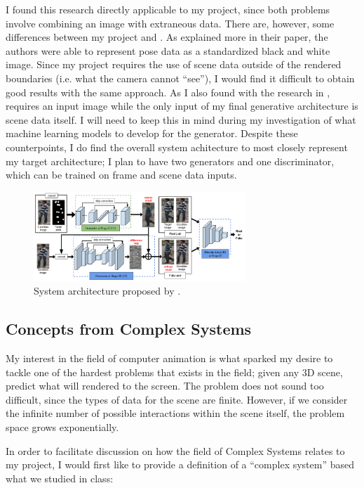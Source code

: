 \documentclass[conference]{IEEEtran}
\begin{document}
I found this research directly applicable
to my project, since both problems involve combining an image with extraneous data. There are, however,
some differences between my project and \cite{ref:pose_guided}. As explained more in their
paper, the authors were able to represent pose data as a standardized black and white image.
Since my project requires the use of scene data outside of the rendered
boundaries (i.e. what the camera cannot ``see''), I would find it difficult to
obtain good results with the same approach. As I also found with the research in
\cite{ref:spatiotemporal}, \cite{ref:pose_guided} requires an input image while the only
input of my final generative architecture is scene data itself. I will need to
keep this in mind during my investigation of what machine learning models to
develop for the generator. Despite these counterpoints, I do find the overall
system achitecture to most closely represent my target architecture; I plan to
have two generators and one discriminator, which can be trained on frame and
scene data inputs.

\begin{figure}[htbp]
\centerline{\includegraphics[width=8cm]{pose_guided.png}}
\caption{System architecture proposed by \cite{ref:pose_guided}.}
\label{fig:pose_guided}
\end{figure}

\subsection{Concepts from Complex Systems}
\label{subsec:complex_systems}
My interest in the field of computer animation is what sparked my desire to
tackle one of the hardest problems that exists in the field; given any 3D scene,
predict what will rendered to the screen. The problem does not sound too
difficult, since the types of data for the scene are finite. However, if we
consider the infinite number of possible interactions within the scene itself,
the problem space grows exponentially.

In order to facilitate discussion on how the field of Complex Systems relates to
my project, I would first like to provide a definition of a ``complex system''
based what we studied in class:
\end{document}
